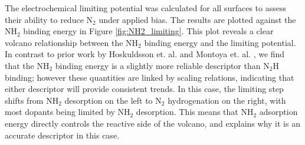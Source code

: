 

The electrochemical limiting potential was calculated for all surfaces to assess their ability to reduce N$_2$ under applied bias. The results are plotted against the NH$_2$ binding energy in Figure \ref{fig:NH2_limiting}. This plot reveals a clear volcano relationship between the NH$_2$ binding energy and the limiting potential. In contrast to prior work by Hoskuldsson et. al.\cite{Hoskuldsson_2017} and Montoya et. al. \cite{Montoya_2015}, we find that the NH$_2$ binding energy is a slightly more reliable descriptor than N$_2$H binding; however these quantities are linked by scaling relations, indicating that either descriptor will provide consistent trends. In this case, the limiting step shifts from NH$_2$ desorption on the left to N$_2$ hydrogenation on the right, with most dopants being limited by NH$_2$ desorption. This means that NH$_2$ adsorption energy directly controls the reactive side of the volcano, and explains why it is an accurate descriptor in this case. 

